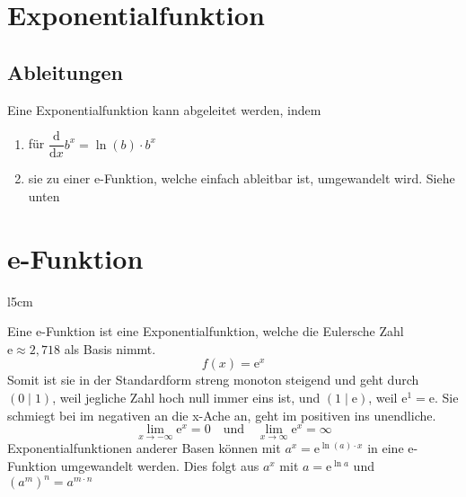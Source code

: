 \documentclass{article}
\begin{document}
  
\section{Exponentialfunktion}
\subsection{Ableitungen}
Eine Exponentialfunktion kann abgeleitet werden, indem
\begin{enumerate}
 \item für $\dfrac{\mathrm{d}}{\mathrm{d}x} b^x = \ln{(b)} \cdot b^x$
 \item sie zu einer e-Funktion, welche einfach ableitbar ist, umgewandelt wird. Siehe unten 
\end{enumerate} 
 
\section{e-Funktion}
\begin{wrapfigure}{l}{5cm}
 \centering
\end{wrapfigure}  
Eine e-Funktion ist eine Exponentialfunktion, welche die Eulersche Zahl $\mathrm{e} \approx 2,718$ als Basis nimmt.
\[
 f(x)=\mathrm{e}^x
\]
Somit ist sie in der Standardform streng monoton steigend und geht durch ${(0 \mid 1)}$, weil jegliche Zahl hoch null immer eins ist, und $(1 \mid \mathrm{e})$, weil $\mathrm{e}^1=\mathrm{e}$. \newline
Sie schmiegt bei im negativen an die x-Ache an, geht im positiven ins unendliche.
\[
 \lim_{x \to -\infty} \mathrm{e}^x = 0
 \quad \text{und} \quad
 \lim_{x \to \infty} \mathrm{e}^x = \infty
\]
Exponentialfunktionen anderer Basen können mit $a^x = \mathrm{e}^{\ln{(a)} \cdot x}$ in eine e-Funktion umgewandelt werden. Dies folgt aus $a^x$ mit $a=\mathrm{e}^{\ln{a}}$ und $(a^m)^n = a^{m \cdot n}$ 
\end{document}
